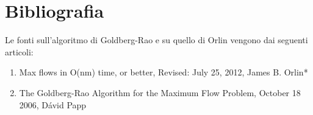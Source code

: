 \documentclass[a4paper, 11pt]{report}
\begin{document}
\chapter*{Bibliografia}
    Le fonti sull'algoritmo di Goldberg-Rao e su quello di Orlin vengono dai seguenti articoli:
   \begin{enumerate}
    \item  Max flows in O(nm) time, or better, Revised: July 25, 2012, James B. Orlin*
    \item The Goldberg-Rao Algorithm for the Maximum Flow Problem, October 18 2006, Dávid Papp
   \end{enumerate}
\end{document}

